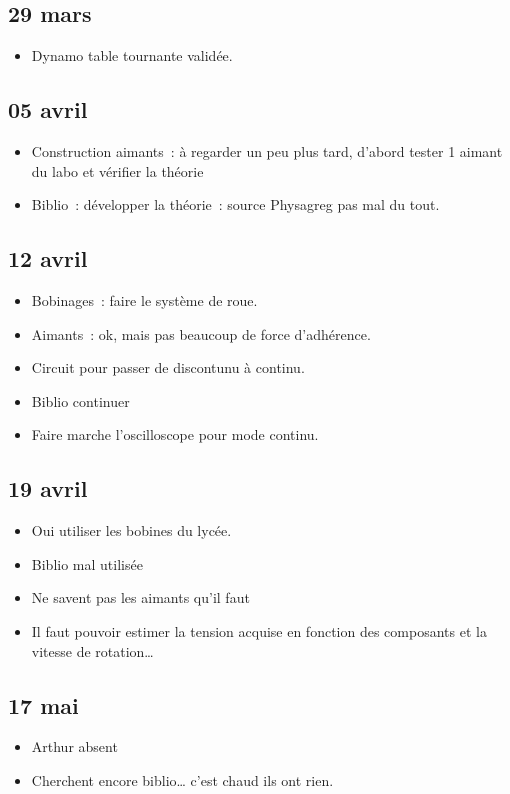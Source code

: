 \documentclass[a4paper, 11pt, final, garamond]{book}
\begin{document}
\subsection{29 mars}
\begin{itemize}
	\item Dynamo table tournante validée.
\end{itemize}

\subsection{05 avril}
\begin{itemize}
	\item Construction aimants~: à regarder un peu plus tard, d'abord tester 1
	      aimant du labo et vérifier la théorie
	\item Biblio~: développer la théorie~: source Physagreg pas mal du tout.
\end{itemize}

\subsection{12 avril}
\begin{itemize}
	\item Bobinages~: faire le système de roue.
	\item Aimants~: ok, mais pas beaucoup de force d'adhérence.
	\item Circuit pour passer de discontunu à continu.
	\item Biblio continuer
	\item Faire marche l'oscilloscope pour mode continu.
\end{itemize}

\subsection{19 avril}
\begin{itemize}
	\item Oui utiliser les bobines du lycée.
	\item Biblio mal utilisée
	\item Ne savent pas les aimants qu'il faut
	\item Il faut pouvoir estimer la tension acquise en fonction des composants et
	      la vitesse de rotation…
\end{itemize}

\subsection{17 mai}
\begin{itemize}
	\item Arthur absent
	\item Cherchent encore biblio… c'est chaud ils ont rien.
\end{itemize}
\end{document}
